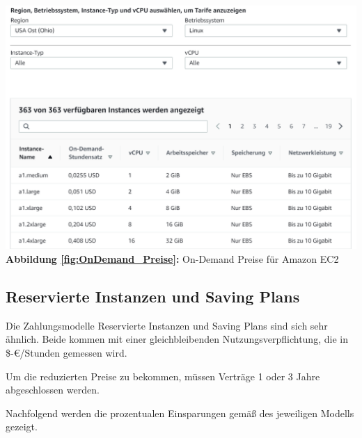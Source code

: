 \begin{center}
    \includegraphics[scale=0.4]{sources/On-Demand-Pläne für Amazon EC2}\label{fig:OnDemand_Preise}\\
    \textbf{Abbildung \autoref{fig:OnDemand_Preise}:} On-Demand Preise für Amazon EC2
        {\cite{AMZ02}}
\end{center}
\subsection{Reservierte Instanzen und Saving Plans}
\begin{flushleft}
    Die Zahlungsmodelle Reservierte Instanzen und Saving Plans sind sich sehr ähnlich. Beide kommen mit einer gleichbleibenden  Nutzungsverpflichtung, die in \$-€/Stunden gemessen wird.

    Um die reduzierten Preise  zu bekommen, müssen Verträge 1 oder 3 Jahre abgeschlossen werden.

    Nachfolgend werden die prozentualen Einsparungen gemäß des jeweiligen Modells gezeigt.
\end{flushleft}

